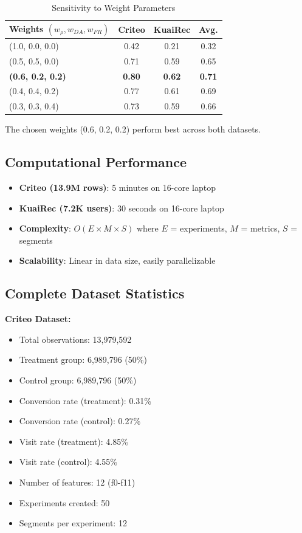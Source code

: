 \documentclass[11pt,twocolumn]{article}
\begin{document}
\begin{table}[H]
\centering
\caption{Sensitivity to Weight Parameters}
\label{tab:sensitivity}
\small
\begin{tabular}{@{}lccc@{}}
\toprule
\textbf{Weights} $(w_\rho, w_{DA}, w_{FR})$ & \textbf{Criteo} & \textbf{KuaiRec} & \textbf{Avg.} \\
\midrule
(1.0, 0.0, 0.0) & 0.42 & 0.21 & 0.32 \\
(0.5, 0.5, 0.0) & 0.71 & 0.59 & 0.65 \\
\textbf{(0.6, 0.2, 0.2)} & \textbf{0.80} & \textbf{0.62} & \textbf{0.71} \\
(0.4, 0.4, 0.2) & 0.77 & 0.61 & 0.69 \\
(0.3, 0.3, 0.4) & 0.73 & 0.59 & 0.66 \\
\bottomrule
\end{tabular}
\end{table}

The chosen weights (0.6, 0.2, 0.2) perform best across both datasets.

\subsection{Computational Performance}

\begin{itemize}
    \item \textbf{Criteo (13.9M rows)}: 5 minutes on 16-core laptop
    \item \textbf{KuaiRec (7.2K users)}: 30 seconds on 16-core laptop
    \item \textbf{Complexity}: $O(E \times M \times S)$ where $E$ = experiments, $M$ = metrics, $S$ = segments
    \item \textbf{Scalability}: Linear in data size, easily parallelizable
\end{itemize}

\subsection{Complete Dataset Statistics}

\textbf{Criteo Dataset:}
\begin{itemize}
    \item Total observations: 13,979,592
    \item Treatment group: 6,989,796 (50\%)
    \item Control group: 6,989,796 (50\%)
    \item Conversion rate (treatment): 0.31\%
    \item Conversion rate (control): 0.27\%
    \item Visit rate (treatment): 4.85\%
    \item Visit rate (control): 4.55\%
    \item Number of features: 12 (f0-f11)
    \item Experiments created: 50
    \item Segments per experiment: 12
\end{itemize}
\end{document}
